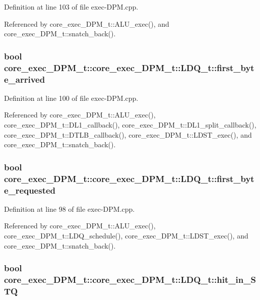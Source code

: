 Definition at line 103 of file exec-DPM.cpp.

Referenced by core\_\-exec\_\-DPM\_\-t::ALU\_\-exec(), and core\_\-exec\_\-DPM\_\-t::snatch\_\-back().
\subsubsection[{first\_\-byte\_\-arrived}]{\setlength{\rightskip}{0pt plus 5cm}bool core\_\-exec\_\-DPM\_\-t::core\_\-exec\_\-DPM\_\-t::LDQ\_\-t::first\_\-byte\_\-arrived}\label{structcore__exec__DPM__t_1_1LDQ__t_9d6d4afce7765aba2628d2b698d9fb80}




Definition at line 100 of file exec-DPM.cpp.

Referenced by core\_\-exec\_\-DPM\_\-t::ALU\_\-exec(), core\_\-exec\_\-DPM\_\-t::DL1\_\-callback(), core\_\-exec\_\-DPM\_\-t::DL1\_\-split\_\-callback(), core\_\-exec\_\-DPM\_\-t::DTLB\_\-callback(), core\_\-exec\_\-DPM\_\-t::LDST\_\-exec(), and core\_\-exec\_\-DPM\_\-t::snatch\_\-back().
\subsubsection[{first\_\-byte\_\-requested}]{\setlength{\rightskip}{0pt plus 5cm}bool core\_\-exec\_\-DPM\_\-t::core\_\-exec\_\-DPM\_\-t::LDQ\_\-t::first\_\-byte\_\-requested}\label{structcore__exec__DPM__t_1_1LDQ__t_9849939f8fb88ebf561452aeb67cb445}




Definition at line 98 of file exec-DPM.cpp.

Referenced by core\_\-exec\_\-DPM\_\-t::ALU\_\-exec(), core\_\-exec\_\-DPM\_\-t::LDQ\_\-schedule(), core\_\-exec\_\-DPM\_\-t::LDST\_\-exec(), and core\_\-exec\_\-DPM\_\-t::snatch\_\-back().
\subsubsection[{hit\_\-in\_\-STQ}]{\setlength{\rightskip}{0pt plus 5cm}bool core\_\-exec\_\-DPM\_\-t::core\_\-exec\_\-DPM\_\-t::LDQ\_\-t::hit\_\-in\_\-STQ}\label{structcore__exec__DPM__t_1_1LDQ__t_7259fcc7eea39db7ca525f84e5ee045f}




